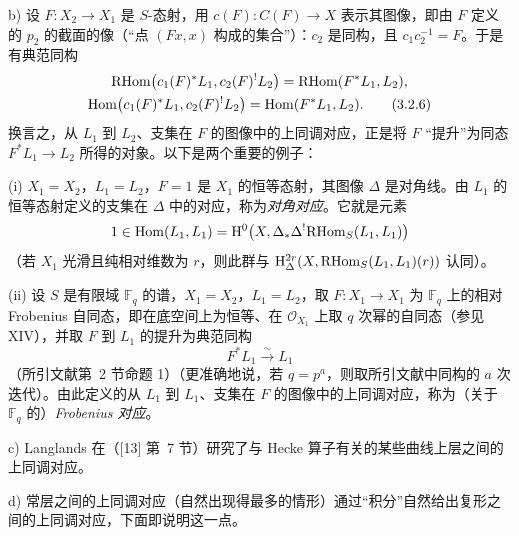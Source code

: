 b) 设 $F:X_2\to X_1$ 是 $S$-态射，用 $c(F):C(F)\to X$ 表示其图像，即由 $F$ 定义的 $p_2$ 的截面的像（“点 $(Fx,x)$ 构成的集合”）：$c_2$ 是同构，且 $c_1c_2^{-1}=F$。于是有典范同构
\begin{equation}\begin{gathered}
\mathrm{RHom}\bigl(c_1(F)^*L_1,c_2(F)^!L_2\bigr)=\mathrm{RHom}(F^*L_1,L_2),
\\
\operatorname{Hom}\bigl(c_1(F)^*L_1,c_2(F)^!L_2\bigr)=\operatorname{Hom}(F^*L_1,L_2).
\tag{3.2.6}
\end{gathered}\end{equation}
换言之，从 $L_1$ 到 $L_2$、支集在 $F$ 的图像中的上同调对应，正是将 $F$ “提升”为同态 $F^*L_1\to L_2$ 所得的对象。以下是两个重要的例子：

(i) $X_1=X_2$，$L_1=L_2$，$F=1$ 是 $X_1$ 的恒等态射，其图像 $\Delta$ 是对角线。由 $L_1$ 的恒等态射定义的支集在 $\Delta$ 中的对应，称为\emph{对角对应}。它就是元素
\[
1\in \operatorname{Hom}(L_1,L_1)=\mathrm{H}^0\bigl(X,\Delta_*\Delta^!\mathrm{RHom}_S(L_1,L_1)\bigr)
\]
（若 $X_1$ 光滑且纯相对维数为 $r$，则此群与 $\mathrm{H}^{2r}_\Delta(X,\mathrm{RHom}_S(L_1,L_1)(r))$ 认同）。

(ii) 设 $S$ 是有限域 $\mathbb F_q$ 的谱，$X_1=X_2$，$L_1=L_2$，取 $F:X_1\to X_1$ 为 $\mathbb F_q$ 上的相对 Frobenius 自同态，即在底空间上为恒等、在 $\mathcal O_{X_1}$ 上取 $q$ 次幂的自同态（参见 XIV），并取 $F$ 到 $L_1$ 的提升为典范同构
\[
F^*L_1\xrightarrow{\sim}L_1
\]
（所引文献第~2 节命题 1）（更准确地说，若 $q=p^a$，则取所引文献中同构的 $a$ 次迭代）。由此定义的从 $L_1$ 到 $L_1$、支集在 $F$ 的图像中的上同调对应，称为（关于 $\mathbb F_q$ 的）\emph{Frobenius 对应}。

c) Langlands 在（[13] 第~7 节）研究了与 Hecke 算子有关的某些曲线上层之间的上同调对应。

d) 常层之间的上同调对应（自然出现得最多的情形）通过“积分”自然给出复形之间的上同调对应，下面即说明这一点。

